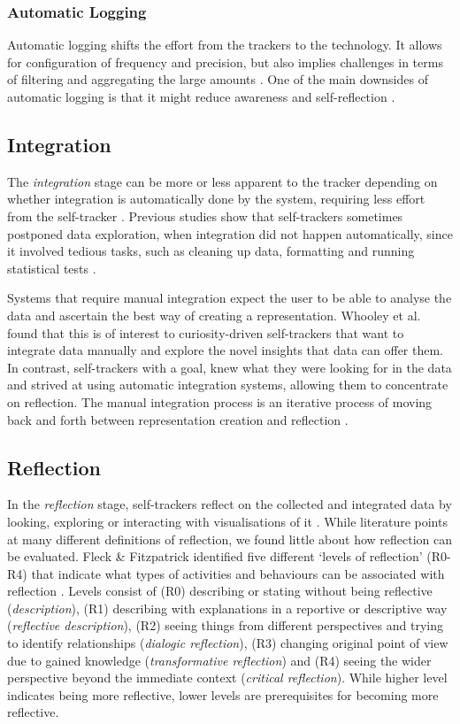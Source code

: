 \subsubsection{Automatic Logging}
Automatic logging shifts the effort from the trackers to the technology. It allows for configuration of frequency and precision, but also implies challenges in terms of filtering and aggregating the large amounts \cite{Muller}. One of the main downsides of automatic logging is that it might reduce awareness and self-reflection \cite{Choe2014, Li2011}.

\subsection{Integration}
The \textit{integration} stage can be more or less apparent to the tracker depending on whether integration is automatically done by the system, requiring less effort from the self-tracker \cite{Li2010}. Previous studies show that self-trackers sometimes postponed data exploration, when integration did not happen automatically, since it involved tedious tasks, such as cleaning up data, formatting and running statistical tests \cite{Choe2014, Chung2015, Li2010}. 

Systems that require manual integration expect the user to be able to analyse the data and ascertain the best way of creating a representation. Whooley et al. found that this is of interest to curiosity-driven self-trackers that want to integrate data manually and explore the novel insights that data can offer them. In contrast, self-trackers with a goal, knew what they were looking for in the data and strived at using automatic integration systems, allowing them to concentrate on reflection. The manual integration process is an iterative process of moving back and forth between representation creation and reflection \cite{Whooley2014}. 

\subsection{Reflection}
In the \textit{reflection} stage, self-trackers reflect on the collected and integrated data by looking, exploring or interacting with visualisations of it \cite{Li2010}. While literature points at many different definitions of reflection, we found little about how reflection can be evaluated. Fleck \& Fitzpatrick identified five different ‘levels of reflection’ (R0-R4) that indicate what types of activities and behaviours can be associated with reflection \cite{Fleck}. Levels consist of (R0) describing or stating without being reflective (\textit{description}), (R1) describing with explanations in a reportive or descriptive way (\textit{reflective description}), (R2) seeing things from different perspectives and trying to identify relationships (\textit{dialogic reflection}), (R3) changing original point of view due to gained knowledge (\textit{transformative reflection}) and (R4) seeing the wider perspective beyond the immediate context (\textit{critical reflection}). While higher level indicates being more reflective, lower levels are prerequisites for becoming more reflective. 

